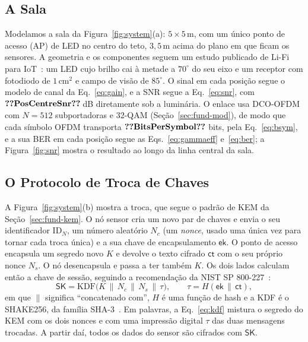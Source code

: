 \documentclass[12pt]{article}
\newcommand{\SK}{\mathsf{SK}}
\newcommand{\ek}{\mathsf{ek}}
\newcommand{\ct}{\mathsf{ct}}
\begin{document}


\subsection{A Sala}\label{sec:room}
Modelamos a sala da Figura~\ref{fig:system}(a): $5\times5$\,m, com um único ponto
de acesso (AP) de LED no centro do teto, $3{,}5$\,m acima do plano em que ficam
os sensores. A geometria e os componentes seguem um estudo publicado de Li-Fi
para IoT~\cite{almoliki2022lci}: um LED cujo brilho cai à metade a $70^{\circ}$
do seu eixo e um receptor com fotodiodo de $1$\,cm$^{2}$ e campo de visão de
$85^{\circ}$. O sinal em cada posição segue o modelo de canal da
Eq.~\eqref{eq:gain}, e a SNR segue a Eq.~\eqref{eq:snr}, com
$\val{PosCentreSnr}$\,dB diretamente sob a luminária. O enlace usa DCO-OFDM com
$N=512$ subportadoras e 32-QAM (Seção~\ref{sec:fund-mod}), de modo que cada
símbolo OFDM transporta $\val{BitsPerSymbol}$ bits, pela Eq.~\eqref{eq:bsym}, e
a sua BER em cada posição segue as Eqs.~\eqref{eq:gammaeff}
e~\eqref{eq:ber}; a Figura~\ref{fig:snr} mostra o resultado ao longo da linha
central da sala.

\subsection{O Protocolo de Troca de Chaves}\label{sec:protocol}
A Figura~\ref{fig:system}(b) mostra a troca, que segue o padrão de KEM da
Seção~\ref{sec:fund-kem}. O nó sensor cria um novo par de chaves e envia o seu
identificador $\mathrm{ID}_N$, um número aleatório $N_c$ (um \emph{nonce},
usado uma única vez para tornar cada troca única) e a sua chave de
encapsulamento $\ek$. O ponto de acesso encapsula um segredo novo $K$ e devolve
o texto cifrado $\ct$ com o seu próprio nonce $N_s$. O nó desencapsula e passa
a ter também $K$. Os dois lados calculam então a chave de sessão, seguindo a
recomendação da NIST SP 800-227~\cite{sp800227}:
\begin{equation}
\SK = \mathrm{KDF}\big(K \,\|\, N_c \,\|\, N_s \,\|\, \tau\big),
\qquad \tau = H(\ek \,\|\, \ct),
\label{eq:kdf}
\end{equation}
em que $\|$ significa ``concatenado com'', $H$ é uma função de hash e a KDF é o
SHAKE256, da família SHA-3~\cite{fips202}. Em palavras, a Eq.~\eqref{eq:kdf}
mistura o segredo do KEM com os dois nonces e com uma impressão digital $\tau$
das duas mensagens trocadas. A partir daí, todos os dados do sensor são
cifrados com $\SK$.
\end{document}
